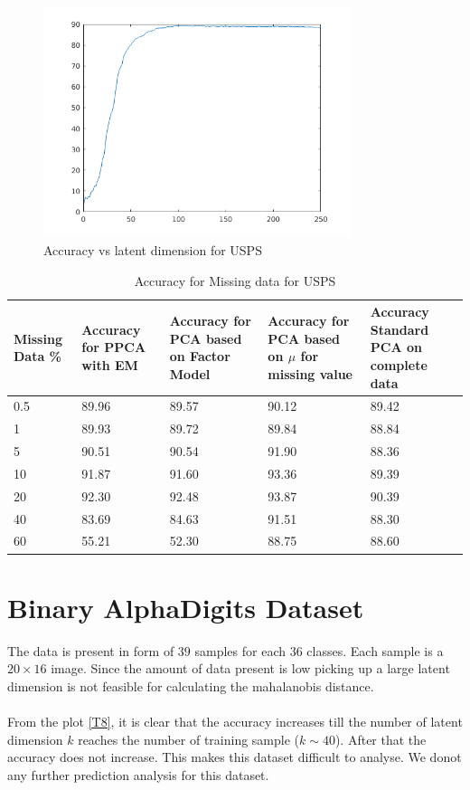 \begin{figure}
\centering
  	\includegraphics[width=0.8\textwidth]{./images/accuracyUSPS.png}
  	\caption{Accuracy vs latent dimension for USPS}
  	\label{T7}
\end{figure}

\begin{table}
\begin{center}
\begin{tabular}{ |p{3cm}|p{3cm}|p{3cm}|p{3cm}|p{3cm}|  }
 \hline
 Missing Data \% &Accuracy for PPCA with EM & Accuracy for PCA based on Factor Model & Accuracy for PCA based on $\mu$ for missing value & Accuracy Standard PCA on complete data\\
 \hline
 \hline
 	0.5 & 89.96 & 89.57 & 90.12 & 89.42\\
 	1 & 89.93 & 89.72 & 89.84 & 88.84\\ 
	5 & 90.51 & 90.54 & 91.90 & 88.36\\ 
	10 & 91.87 & 91.60 & 93.36 & 89.39\\	
	20 & 92.30 & 92.48 & 93.87 & 90.39 \\
	40 & 83.69 & 84.63 & 91.51 & 88.30\\
	60 & 55.21 & 52.30 & 88.75 & 88.60\\
 \hline
\end{tabular}
\end{center}
\caption{Accuracy for Missing data for USPS}
\label{Tb2}
\end{table}

\newpage

\section{Binary AlphaDigits Dataset}
The data is present in form of $39$ samples for each $36$ classes. Each sample is a $20\times 16$ image. Since the amount of data present is low picking up a large latent dimension is not feasible for calculating the mahalanobis distance. \\\\
From the plot \ref{T8}, it is clear that the accuracy increases till the number of latent dimension $k$ reaches the number of training sample ($k \sim 40$). After that the accuracy does not increase. This makes this dataset difficult to analyse. We donot any further prediction analysis for this dataset. 

